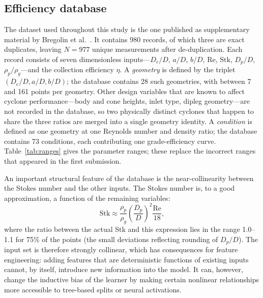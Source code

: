 \documentclass[12pt]{article}
\newcommand{\Stk}{\mathrm{Stk}}
\newcommand{\Rey}{\mathrm{Re}}
\begin{document}
\subsection{Efficiency database}
The dataset used throughout this study is the one published as supplementary material by Bregolin et al.\ \cite{bregolin}. It contains 980 records, of which three are exact duplicates, leaving $N=977$ unique measurements after de-duplication. Each record consists of seven dimensionless inputs---$D_e/D$, $a/D$, $b/D$, $\Rey$, $\Stk$, $D_p/D$, $\rho_p/\rho_g$---and the collection efficiency $\eta$. A \emph{geometry} is defined by the triplet $(D_e/D, a/D, b/D)$; the database contains 28 such geometries, with between 7 and 161 points per geometry. Other design variables that are known to affect cyclone performance---body and cone heights, inlet type, dipleg geometry---are not recorded in the database, so two physically distinct cyclones that happen to share the three ratios are merged into a single geometry identity. A \emph{condition} is defined as one geometry at one Reynolds number and density ratio; the database contains 73 conditions, each contributing one grade-efficiency curve. Table~\ref{tab:ranges} gives the parameter ranges; these replace the incorrect ranges that appeared in the first submission.

\begin{table}[!ht]\centering\caption{Parameter ranges (977 unique points, 28 geometries).}\label{tab:ranges}\end{table}

An important structural feature of the database is the near-collinearity between the Stokes number and the other inputs. The Stokes number is, to a good approximation, a function of the remaining variables:
\begin{equation}
\Stk \approx \frac{\rho_p}{\rho_g}\left(\frac{D_p}{D}\right)^2 \frac{\Rey}{18},
\end{equation}
where the ratio between the actual Stk and this expression lies in the range 1.0--1.1 for 75\% of the points (the small deviations reflecting rounding of $D_p/D$). The input set is therefore strongly collinear, which has consequences for feature engineering: adding features that are deterministic functions of existing inputs cannot, by itself, introduce new information into the model. It can, however, change the inductive bias of the learner by making certain nonlinear relationships more accessible to tree-based splits or neural activations.
\end{document}
